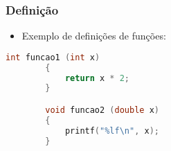 \begin{frame}[fragile]
\frametitle{Definição}
        
    \begin{itemize}
        
        \item Exemplo de definições de funções:

    \end{itemize}
    
    \begin{lstlisting}[language=C]
        int funcao1 (int x)
        {
            return x * 2;
        }

        void funcao2 (double x)
        {
            printf("%lf\n", x);
        }
    \end{lstlisting}
        
\end{frame}
